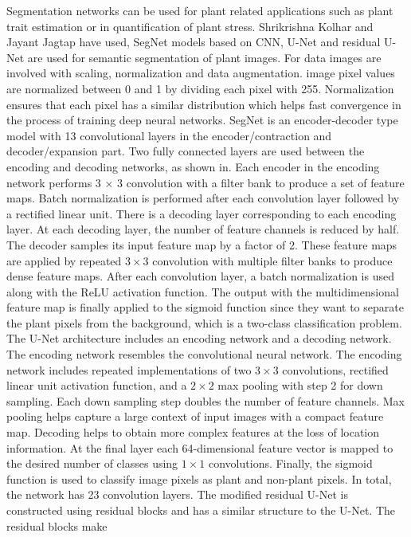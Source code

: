 Segmentation networks can be used for plant related applications such as plant trait estimation or in quantification of plant stress.
Shrikrishna Kolhar and Jayant Jagtap\cite{KOLHAR2021101373} have used, SegNet\cite{badrinarayanan2017segnet} models based on CNN, U-Net\cite{ronneberger2015u} and residual U-Net are used for semantic segmentation of plant images. For data images are involved
with scaling, normalization and data augmentation. image pixel values are normalized between 0 and 1 by dividing each pixel with 255. Normalization ensures that each pixel
has a similar distribution which helps fast convergence in the process of training deep neural networks. SegNet is an encoder-decoder type model with 13 convolutional
layers in the encoder/contraction and decoder/expansion part. Two fully connected layers are used between the encoding and decoding networks, as shown in. Each encoder
in the encoding network performs 3 × 3 convolution with a filter bank to produce a set of feature maps. Batch normalization is performed after each convolution layer
followed by a rectified linear unit. There is a decoding layer corresponding to each encoding layer. At each decoding layer, the number of feature channels is reduced
by half. The decoder samples its input feature map by a factor of 2. These feature maps are applied by repeated $3 \times 3$ convolution with multiple filter banks to produce
dense feature maps. After each convolution layer, a batch normalization is used along with the ReLU activation function. The output with the multidimensional feature
map is finally applied to the sigmoid function since they want to separate the plant pixels from the background, which is a two-class classification problem. The U-Net
architecture includes an encoding network and a decoding network. The encoding network resembles the convolutional neural network. The encoding network includes
repeated implementations of two $3 \times 3$ convolutions, rectified linear unit activation function, and a $2 \times 2$ max pooling with step
2 for down sampling. Each down sampling step doubles the number of feature channels. Max pooling helps capture a large context of input images with a
compact feature map. Decoding helps to obtain more complex features at the loss of location information. At the final layer each 64-dimensional feature vector is mapped
to the desired number of classes using $1 \times 1$ convolutions. Finally, the sigmoid function is used to classify image pixels as plant and non-plant pixels. In total, the
network has 23 convolution layers. The modified residual U-Net is constructed using residual blocks and has a similar structure to the U-Net. The residual blocks make
